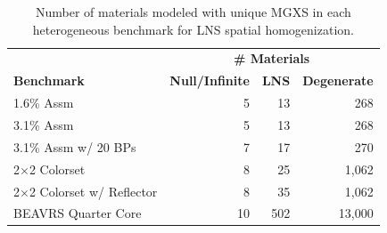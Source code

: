 \begin{table}[h!]
  \centering
  \caption[Number of materials for LNS spatial homogenization]{Number of materials modeled with unique \ac{MGXS} in each heterogeneous benchmark for \ac{LNS} spatial homogenization.}
  \small
  \label{table:chap9-num-materials-lns}
  \vspace{6pt}
  \begin{tabular}{l r r r}
  \toprule
  \rowcolor{lightgray}
  & \multicolumn{3}{c}{\cellcolor{lightgray} \bf \# Materials} \\
  \multirow{-2}{*}{\cellcolor{lightgray} \bf Benchmark} &
  \multicolumn{1}{c}{\cellcolor{lightgray} \bf Null/Infinite} &
  \multicolumn{1}{c}{\cellcolor{lightgray} \bf \ac{LNS}} &
  \multicolumn{1}{c}{\cellcolor{lightgray} \bf Degenerate} \\
  \midrule
1.6\% Assm & 5 & 13 & 268 \\
3.1\% Assm & 5 & 13 & 268 \\
3.1\% Assm w/ 20 BPs & 7 & 17 & 270  \\
2$\times$2 Colorset & 8 & 25 & 1,062 \\
2$\times$2 Colorset w/ Reflector & 8 & 35 & 1,062 \\
\ac{BEAVRS} Quarter Core & 10 & 502 & 13,000 \\ %
  \bottomrule
\end{tabular}
\end{table}


